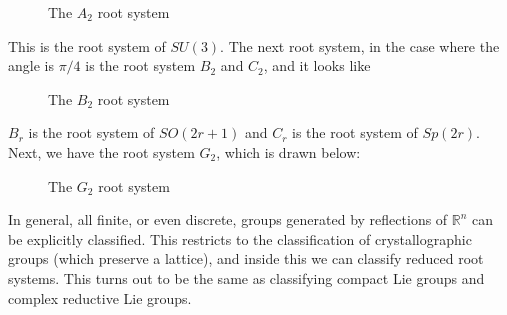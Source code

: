 \documentclass[leqno, openany]{memoir}
\theoremstyle{definition}
\theoremstyle{remark}
\theoremstyle{plain}
\theoremstyle{definition}
\theoremstyle{remark}
\newcommand{\R}{\mathbb{R}}
\begin{document}
\begin{figure}[H]
\begin{center}
\end{center}
\caption{The $A_2$ root system}%
\label{fig:root-system}
\end{figure}


This is the root system of $SU(3)$. The next root system, in the case where the angle is $\pi/4$ is the root system $B_2$ and $C_2$, and it looks like

\begin{figure}[H]
\begin{center}
\end{center}
\caption{The $B_2$ root system}%
\label{fig:root-system-2}
\end{figure}

$B_r$ is the root system of $SO(2r+1)$ and $C_r$ is the root system of $Sp(2r)$. Next, we have the root system $G_2$, which is drawn below:

\begin{figure}[H]
\begin{center}
\end{center}
\caption{The $G_2$ root system}%
\label{fig:root-system-3}
\end{figure}

In general, all finite, or even discrete, groups generated by reflections of $\R^n$ can be explicitly classified. This restricts to the classification of crystallographic groups (which preserve a lattice), and inside this we can classify reduced root systems. This turns out to be the same as classifying compact Lie groups and complex reductive Lie groups.
\end{document}
